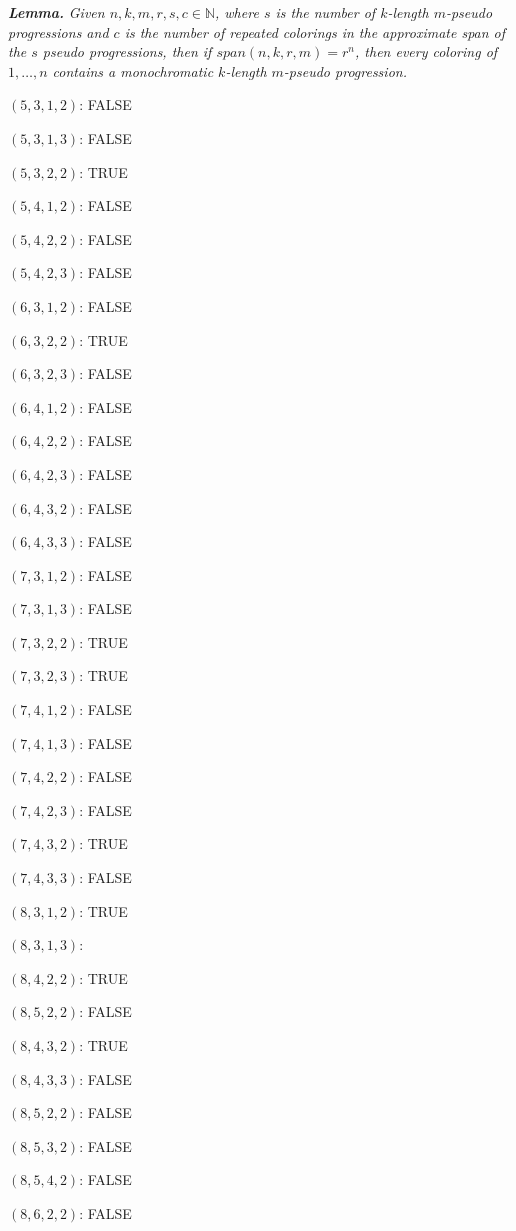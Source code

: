 \documentclass[12pt, a4paper]{article}
\begin{document}
\vspace{6mm}

\textit{\textbf{Lemma. }}\textit{Given $n,k,m,r,s,c\in\mathbb{N}$, where $s$ is the number of $k$-length $m$-pseudo progressions and $c$ is the number of repeated colorings in the approximate span of the $s$ pseudo progressions, then if $span(n,k,r,m)=r^n$, then every coloring of $1,\dots,n$ contains a monochromatic $k$-length $m$-pseudo progression.}

\newpage

\begin{description}
    \item$(5,3,1,2)$: FALSE
    \item$(5,3,1,3)$: FALSE
    \item$(5,3,2,2)$: TRUE
    \item$(5,4,1,2)$: FALSE
    \item$(5,4,2,2)$: FALSE
    \item$(5,4,2,3)$: FALSE
    \item$(6,3,1,2)$: FALSE
    \item$(6,3,2,2)$: TRUE
    \item$(6,3,2,3)$: FALSE
    \item$(6,4,1,2)$: FALSE
    \item$(6,4,2,2)$: FALSE
    \item$(6,4,2,3)$: FALSE
    \item$(6,4,3,2)$: FALSE
    \item$(6,4,3,3)$: FALSE
    \item$(7,3,1,2)$: FALSE
    \item$(7,3,1,3)$: FALSE
    \item$(7,3,2,2)$: TRUE
    \item$(7,3,2,3)$: TRUE
    \item$(7,4,1,2)$: FALSE
    \item$(7,4,1,3)$: FALSE
    \item$(7,4,2,2)$: FALSE
    \item$(7,4,2,3)$: FALSE 
    \item$(7,4,3,2)$: TRUE
    \item$(7,4,3,3)$: FALSE
    \item$(8,3,1,2)$: TRUE
    \item$(8,3,1,3)$: 
    \item$(8,4,2,2)$: TRUE
    \item$(8,5,2,2)$: FALSE
    \item$(8,4,3,2)$: TRUE
    \item$(8,4,3,3)$: FALSE
    \item$(8,5,2,2)$: FALSE
    \item$(8,5,3,2)$: FALSE
    \item$(8,5,4,2)$: FALSE
    \item$(8,6,2,2)$: FALSE
\end{description}


  
\end{document}

